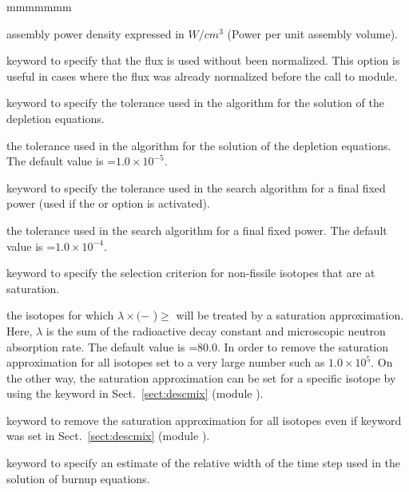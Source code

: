 \begin{ListeDeDescription}{mmmmmmm}
\item[\dusa{apower}] assembly power density expressed in $W/cm^3$ (Power per
unit assembly volume).

\item[\moc{KEEP}] keyword to specify that the flux is used without been normalized.
This option is useful in cases where the flux was already normalized before the call to
 module.

\item[\moc{EPS1}] keyword to specify the tolerance used in the algorithm for
the solution of the depletion equations.

\item[\dusa{valeps1}] the tolerance used in the algorithm for the solution of the
depletion equations. The default value is =$1.0\times 10^{-5}$.

\item[\moc{EPS2}] keyword to specify the tolerance used in the search
algorithm for a final fixed power (used if the  or  option is activated).

\item[\dusa{valeps2}] the tolerance used in the search algorithm for a final
fixed power. The default value is =$1.0\times 10^{-4}$.

\item[\moc{EXPM}] keyword to specify the selection criterion for non-fissile
isotopes that are at saturation.

\item[\dusa{valexp}] the isotopes for which $\lambda \times($$-$
)$ \ge $ will be treated by a saturation approximation. Here,
$\lambda$ is the sum of the radioactive decay constant and microscopic neutron
absorption rate. The default value is =80.0. In order to remove the
saturation approximation for all isotopes set  to a very large number
such as $1.0\times 10^{5}$. On the other way, the saturation approximation can be set
for a specific isotope by using the keyword  in Sect.~\ref{sect:descmix}
(module ).

\item[\moc{SATOFF}] keyword to remove the saturation approximation for all isotopes
even if  keyword was set in Sect.~\ref{sect:descmix} (module ).

\item[\moc{H1}] keyword to specify an estimate of the relative width of the
time step used in the solution of burnup equations.


\end{ListeDeDescription}
